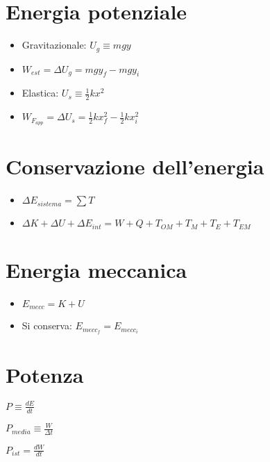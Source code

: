 \documentclass[a4paper,14pt,landscape]{extarticle}
\begin{document}
\begin{multicols*}{2}
    \section*{Energia potenziale}
    \begin{itemize}
        \item Gravitazionale: $U_g \equiv mgy$
        \item $W_{est} = \Delta U_g = mgy_f - mgy_i$
        \item Elastica: $U_s \equiv \tfrac{1}{2} kx^2$
        \item $W_{F_{app}} = \Delta U_s = \tfrac{1}{2}kx_f^2 - \tfrac{1}{2}kx_i^2$
    \end{itemize}

    \section*{Conservazione dell'energia}
    \begin{itemize}
        \item $\Delta E_{sistema} = \sum T$
        \item $\Delta K + \Delta U + \Delta E_{int} = W + Q + T_{OM} + T_{M} + T_{E}+ T_{EM}$
    \end{itemize}

    \section*{Energia meccanica}
    \begin{itemize}
        \item $E_{mecc} = K + U$
        \item Si conserva: $E_{mecc_f} = E_{mecc_i}$
    \end{itemize}

    \section*{Potenza}
    \begin{itemize}
        \begin{multicols*}{3}
            \item $P \equiv \tfrac{dE}{dt}$
            \item $P_{media} \equiv \tfrac{W}{\Delta t}$
            \item $P_{ist} = \tfrac{dW}{dt}$
        \end{multicols*}
    \end{itemize}


\end{multicols*}
\end{document}
